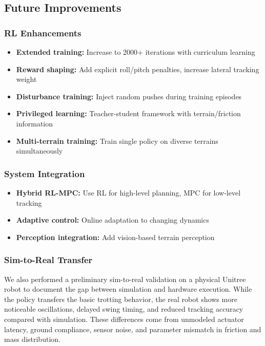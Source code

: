 \documentclass[12pt,a4paper]{article}
\begin{document}
\subsection{Future Improvements}

\subsubsection{RL Enhancements}
\begin{itemize}
    \item \textbf{Extended training:} Increase to 2000+ iterations with curriculum learning
    \item \textbf{Reward shaping:} Add explicit roll/pitch penalties, increase lateral tracking weight
    \item \textbf{Disturbance training:} Inject random pushes during training episodes
    \item \textbf{Privileged learning:} Teacher-student framework with terrain/friction information
    \item \textbf{Multi-terrain training:} Train single policy on diverse terrains simultaneously
\end{itemize}

\subsubsection{System Integration}
\begin{itemize}
    \item \textbf{Hybrid RL-MPC:} Use RL for high-level planning, MPC for low-level tracking
    \item \textbf{Adaptive control:} Online adaptation to changing dynamics
    \item \textbf{Perception integration:} Add vision-based terrain perception
\end{itemize}

\subsubsection{Sim-to-Real Transfer}

We also performed a preliminary sim-to-real validation on a physical Unitree robot to document the gap between simulation and hardware execution. While the policy transfers the basic trotting behavior, the real robot shows more noticeable oscillations, delayed swing timing, and reduced tracking accuracy compared with simulation. These differences come from unmodeled actuator latency, ground compliance, sensor noise, and parameter mismatch in friction and mass distribution.
\end{document}
